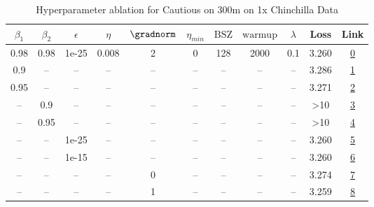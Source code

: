 \begin{table}[H]
\centering
\caption{Hyperparameter ablation for Cautious on 300m on 1x Chinchilla Data}
\label{tab:ablation_cautious_300m_on_1x_chinchilla_data}
\begin{tabular}{ccccccccccc}
\toprule
$\beta_1$ & $\beta_2$ & $\epsilon$ & $\eta$ & $\gradnorm$ & $\eta_{min}$ & $\mathrm{BSZ}$ & $\mathrm{warmup}$ & $\lambda$ & Loss & Link \\
\midrule
0.98 & 0.98 & 1e-25 & 0.008 & 2 & 0 & 128 & 2000 & 0.1 & 3.260 & \href{https://wandb.ai/stanford-mercury/optimizer-scaling/runs/sweep-300m-6B-cautiousc8346clr0.008-wd0.1-minlr0-warmup2000-b10.-852297}{0} \\
\midrule
0.9 & -- & -- & -- & -- & -- & -- & -- & -- & 3.286 & \href{https://wandb.ai/stanford-mercury/optimizer-scaling/runs/sweep-300m-6B-cautiousfed852lr0.008-wd0.1-minlr0-warmup2000-b10.-4b06ef}{1} \\
0.95 & -- & -- & -- & -- & -- & -- & -- & -- & 3.271 & \href{https://wandb.ai/stanford-mercury/optimizer-scaling/runs/sweep-300m-6B-cautious7244dblr0.008-wd0.1-minlr0-warmup2000-b10.-5fd975}{2} \\
-- & 0.9 & -- & -- & -- & -- & -- & -- & -- & >10 & \href{https://wandb.ai/stanford-mercury/optimizer-scaling/runs/sweep-300m-6B-cautiousd8e2a3lr0.008-wd0.1-minlr0-warmup2000-b10.-3812f2}{3} \\
-- & 0.95 & -- & -- & -- & -- & -- & -- & -- & >10 & \href{https://wandb.ai/stanford-mercury/optimizer-scaling/runs/sweep-300m-6B-cautious69dafalr0.008-wd0.1-minlr0-warmup2000-b10.-5e0115}{4} \\
-- & -- & 1e-25 & -- & -- & -- & -- & -- & -- & 3.260 & \href{https://wandb.ai/stanford-mercury/optimizer-scaling/runs/sweep-300m-6B-cautiousc8346clr0.008-wd0.1-minlr0-warmup2000-b10.-852297}{5} \\
-- & -- & 1e-15 & -- & -- & -- & -- & -- & -- & 3.260 & \href{https://wandb.ai/stanford-mercury/optimizer-scaling/runs/sweep-300m-6B-cautious56bf47lr0.008-wd0.1-minlr0-warmup2000-b10.-19a98d}{6} \\
-- & -- & -- & -- & 0 & -- & -- & -- & -- & 3.274 & \href{https://wandb.ai/stanford-mercury/optimizer-scaling/runs/sweep-300m-6B-cautiousd6637dlr0.008-wd0.1-minlr0-warmup2000-b10.-2815cd}{7} \\
-- & -- & -- & -- & 1 & -- & -- & -- & -- & 3.259 & \href{https://wandb.ai/stanford-mercury/optimizer-scaling/runs/sweep-300m-6B-cautiousbb2ad9lr0.008-wd0.1-minlr0-warmup2000-b10.-fd7e98}{8} \\

\end{tabular}
\end{table}
